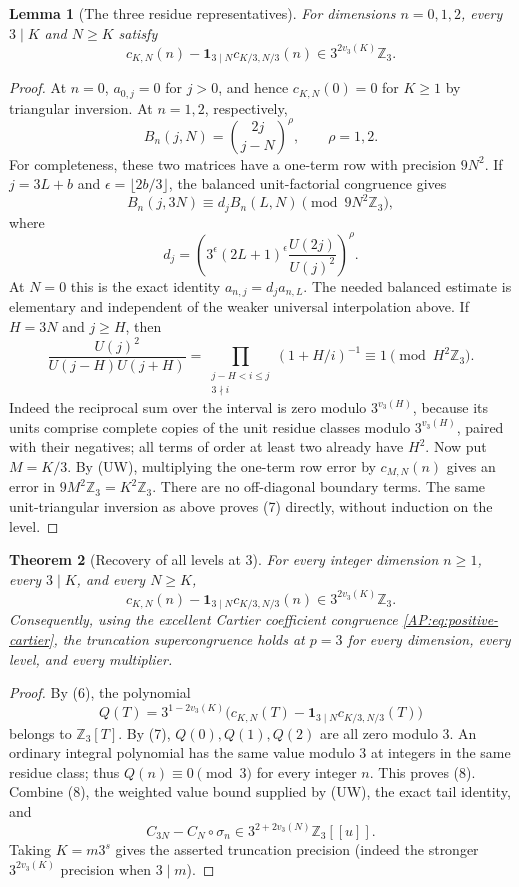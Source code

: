 \documentclass[11pt,a4paper]{article}
\newtheorem{theorem}{Theorem}[section]
\newtheorem{lemma}[theorem]{Lemma}
\theoremstyle{definition}\newtheorem{definition}[theorem]{Definition}
\theoremstyle{remark}\newtheorem{remark}[theorem]{Remark}
\numberwithin{equation}{section}
\begin{document}
\begin{lemma}[The three residue representatives]
For dimensions $n=0,1,2$, every $3\mid K$ and $N\ge K$ satisfy
\[
 c_{K,N}(n)-\mathbf1_{3\mid N}c_{K/3,N/3}(n)
                         \in3^{2v_3(K)}\mathbb Z_3.
\tag{7}
\]
\end{lemma}
\begin{proof}
At $n=0$, $a_{0,j}=0$ for $j>0$, and hence $c_{K,N}(0)=0$ for
$K\ge1$ by triangular inversion.  At $n=1,2$, respectively,
\[
 B_n(j,N)=\binom{2j}{j-N}^{\rho},\qquad \rho=1,2.
\]
For completeness, these two matrices have a one-term row with
precision $9N^2$.  If $j=3L+b$ and
$\epsilon=\lfloor2b/3\rfloor$, the balanced unit-factorial
congruence gives
\[
 B_n(j,3N)\equiv d_j B_n(L,N)\pmod{9N^2\mathbb Z_3},
\]
where
\[
 d_j=\left(3^\epsilon(2L+1)^\epsilon
                          \frac{U(2j)}{U(j)^2}\right)^{\rho}.
\]
At $N=0$ this is the exact identity $a_{n,j}=d_j a_{n,L}$.
The needed balanced estimate is elementary and independent of the
weaker universal interpolation above.  If $H=3N$ and $j\ge H$, then
\[
 \frac{U(j)^2}{U(j-H)U(j+H)}
  =\prod_{\substack{j-H<i\le j\\3\nmid i}}(1+H/i)^{-1}
  \equiv1\pmod{H^2\mathbb Z_3}.
\]
Indeed the reciprocal sum over the interval is zero modulo
$3^{v_3(H)}$, because its units comprise complete copies of the
unit residue classes modulo $3^{v_3(H)}$, paired with their negatives;
all terms of order at least two already have $H^2$.
Now put $M=K/3$.  By (UW), multiplying the one-term row error by
$c_{M,N}(n)$ gives an error in $9M^2\mathbb Z_3=K^2\mathbb Z_3$.
There are no off-diagonal boundary terms.  The same unit-triangular
inversion as above proves (7) directly, without induction on the level.
\end{proof}

\begin{theorem}[Recovery of all levels at $3$]
For every integer dimension $n\ge1$, every
$3\mid K$, and every $N\ge K$,
\[
 c_{K,N}(n)-\mathbf1_{3\mid N}c_{K/3,N/3}(n)
                         \in3^{2v_3(K)}\mathbb Z_3.
\tag{8}
\]
Consequently, using the excellent Cartier coefficient congruence
\eqref{AP:eq:positive-cartier}, the truncation supercongruence
holds at $p=3$ for every dimension, every level, and every multiplier.
\end{theorem}
\begin{proof}
By (6), the polynomial
\[
 Q(T)=3^{1-2v_3(K)}
       \bigl(c_{K,N}(T)-\mathbf1_{3\mid N}c_{K/3,N/3}(T)\bigr)
\]
belongs to $\mathbb Z_3[T]$.  By (7), $Q(0),Q(1),Q(2)$ are all
zero modulo $3$.  An ordinary integral polynomial has the same
value modulo $3$ at integers in the same residue class; thus
$Q(n)\equiv0\pmod3$ for every integer $n$.  This proves (8).
Combine (8), the weighted value bound supplied by (UW), the exact
tail identity, and
\[
 C_{3N}-C_N\circ\sigma_n\in3^{2+2v_3(N)}\mathbb Z_3[[u]].
\]
Taking $K=m3^s$ gives the asserted truncation precision (indeed the
stronger $3^{2v_3(K)}$ precision when $3\mid m$).
\end{proof}
\end{document}
